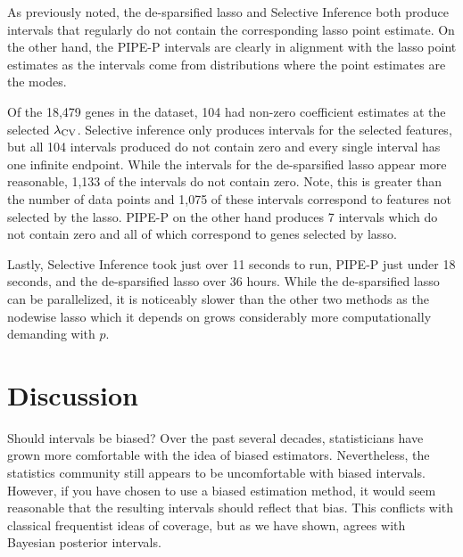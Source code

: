 As previously noted, the de-sparsified lasso and Selective Inference both produce intervals that regularly do not contain the corresponding lasso point estimate. On the other hand, the PIPE-P intervals are clearly in alignment with the lasso point estimates as the intervals come from distributions where the point estimates are the modes.

Of the 18,479 genes in the dataset, 104 had non-zero coefficient estimates at the selected $\lambda_{\textrm{CV}}$. Selective inference only produces intervals for the selected features, but all 104 intervals produced do not contain zero and every single interval has one infinite endpoint. While the intervals for the de-sparsified lasso appear more reasonable, 1,133 of the intervals do not contain zero. Note, this is greater than the number of data points and 1,075 of these intervals correspond to features not selected by the lasso. PIPE-P on the other hand produces 7 intervals which do not contain zero and all of which correspond to genes selected by lasso. 

Lastly, Selective Inference took just over 11 seconds to run, PIPE-P just under 18 seconds, and the de-sparsified lasso over 36 hours. While the de-sparsified lasso can be parallelized, it is noticeably slower than the other two methods as the nodewise lasso which it depends on grows considerably more computationally demanding with $p$.

\section{Discussion} \label{Sec:discussion}

Should intervals be biased? Over the past several decades, statisticians have grown more comfortable with the idea of biased estimators. Nevertheless, the statistics community still appears to be uncomfortable with biased intervals. However, if you have chosen to use a biased estimation method, it would seem reasonable that the resulting intervals should reflect that bias. This conflicts with classical frequentist ideas of coverage, but as we have shown, agrees with Bayesian posterior intervals.

